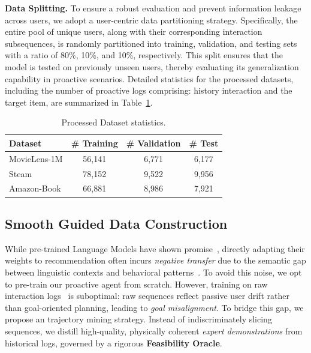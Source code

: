 \documentclass{llmxive}
\begin{document}
\textbf{Data Splitting.} To ensure a robust evaluation and prevent information leakage across users, we adopt a user-centric data partitioning strategy. Specifically, the entire pool of unique users, along with their corresponding interaction subsequences, is randomly partitioned into training, validation, and testing sets with a ratio of 80\%, 10\%, and 10\%, respectively. This split ensures that the model is tested on previously unseen users, thereby evaluating its generalization capability in proactive scenarios. Detailed statistics for the processed datasets, including the number of proactive logs comprising: history interaction and the target item, are summarized in Table~\ref{tab:processed}.

\begin{table}[t]
 \begin{center}
\begin{tabular}{lccc}
 \toprule[1.5pt]
 \textbf{Dataset} & \textbf{\# Training} & \textbf{\# Validation} & \textbf{\# Test} \\
 \midrule
 MovieLens-1M & 56,141 & 6,771 & 6,177\\
 Steam & 78,152 & 9,522 & 9,956\\
 Amazon-Book & 66,881 & 8,986 & 7,921\\
 \bottomrule[1.5pt]
 \end{tabular}
 \end{center}
 
\caption{Processed Dataset statistics.}
\label{tab:processed}
\end{table}

\subsection{Smooth Guided Data Construction}
\label{app:data_process}

While pre-trained Language Models have shown promise~\cite{brown2020language,ouyang2022training}, directly adapting their weights to recommendation often incurs \textit{negative transfer} due to the semantic gap between linguistic contexts and behavioral patterns~\cite{zhang2025collm,bao2023tallrec,wang2025predicting}. To avoid this noise, we opt to pre-train our proactive agent from scratch. However, training on raw interaction logs~\cite{zhu2023influential} is suboptimal: raw sequences reflect passive user drift rather than goal-oriented planning, leading to \textit{goal misalignment}. To bridge this gap, we propose an trajectory mining strategy. Instead of indiscriminately slicing sequences, we distill high-quality, physically coherent \textit{expert demonstrations} from historical logs, governed by a rigorous \textbf{Feasibility Oracle}.
\end{document}
